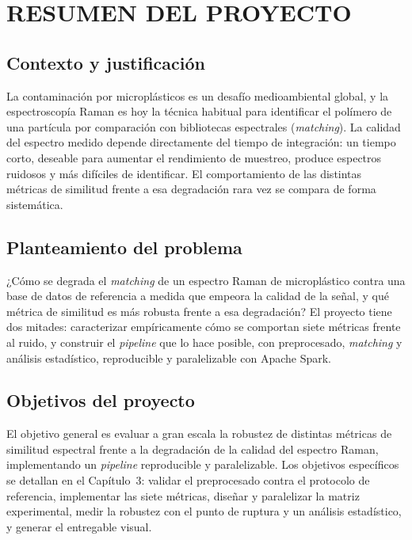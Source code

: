 \chapter{RESUMEN DEL PROYECTO}

\section{Contexto y justificación}

La contaminación por microplásticos es un desafío medioambiental global, y la espectroscopía Raman es hoy la técnica habitual para identificar el polímero de una partícula por comparación con bibliotecas espectrales (\textit{matching}). La calidad del espectro medido depende directamente del tiempo de integración: un tiempo corto, deseable para aumentar el rendimiento de muestreo, produce espectros ruidosos y más difíciles de identificar. El comportamiento de las distintas métricas de similitud frente a esa degradación rara vez se compara de forma sistemática.

\section{Planteamiento del problema}

¿Cómo se degrada el \textit{matching} de un espectro Raman de microplástico contra una base de datos de referencia a medida que empeora la calidad de la señal, y qué métrica de similitud es más robusta frente a esa degradación? El proyecto tiene dos mitades: caracterizar empíricamente cómo se comportan siete métricas frente al ruido, y construir el \textit{pipeline} que lo hace posible, con preprocesado, \textit{matching} y análisis estadístico, reproducible y paralelizable con Apache Spark.

\section{Objetivos del proyecto}

El objetivo general es evaluar a gran escala la robustez de distintas métricas de similitud espectral frente a la degradación de la calidad del espectro Raman, implementando un \textit{pipeline} reproducible y paralelizable. Los objetivos específicos se detallan en el Capítulo~3: validar el preprocesado contra el protocolo de referencia, implementar las siete métricas, diseñar y paralelizar la matriz experimental, medir la robustez con el punto de ruptura y un análisis estadístico, y generar el entregable visual.


